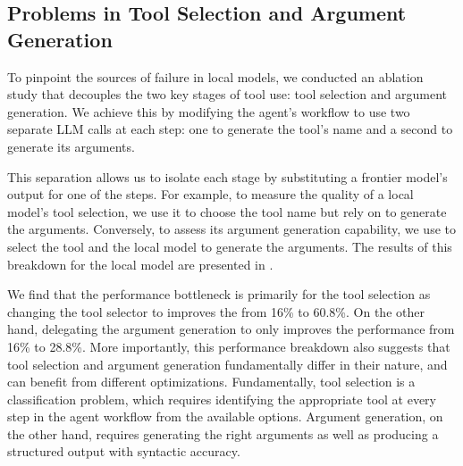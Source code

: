 


\subsection{Problems in Tool Selection and Argument Generation}
To pinpoint the sources of failure in local models, we conducted an ablation study that decouples the two key stages of tool use: tool selection and argument generation. We achieve this by modifying the agent's workflow to use two separate LLM calls at each step: one to generate the tool's name and a second to generate its arguments.

This separation allows us to isolate each stage by substituting a frontier model's output for one of the steps. For example, to measure the quality of a local model's tool selection, we use it to choose the tool name but rely on \gptfivemini{} to generate the arguments. Conversely, to assess its argument generation capability, we use \gptfivemini{} to select the tool and the local model to generate the arguments. The results of this breakdown for the \baselinemodel{} local model are presented in .


We find that the performance bottleneck is primarily for the tool selection as changing the tool selector to \gptfivemini{} improves the \judgemetric{} from 16\% to 60.8\%. On the other hand, delegating the argument generation to \gptfivemini{} only improves the performance from 16\% to 28.8\%. More importantly, this performance breakdown also suggests that tool selection and argument generation fundamentally differ in their nature, and can benefit from different optimizations. Fundamentally, tool selection is a classification problem, which requires identifying the appropriate tool at every step in the agent workflow from the available options. Argument generation, on the other hand, requires generating the right arguments as well as producing a structured output with syntactic accuracy. 

